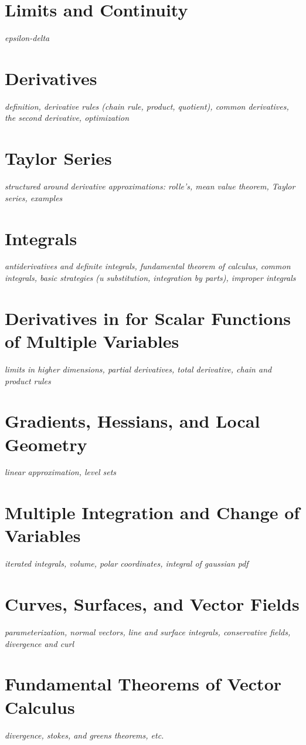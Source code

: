 \documentclass[../../../main.tex]{subfiles}
\begin{document}

\section{Limits and Continuity}
\textit{epsilon-delta}
\section{Derivatives}
\textit{definition, derivative rules (chain rule, product, quotient), common derivatives, the second derivative, optimization}
\section{Taylor Series}
\textit{structured around derivative approximations: rolle's, mean value theorem, Taylor series, examples}
\section{Integrals}
\textit{antiderivatives and definite integrals, fundamental theorem of calculus, common integrals, basic strategies (u substitution, integration by parts), improper integrals}
\section{Derivatives in for Scalar Functions of Multiple Variables}
\textit{limits in higher dimensions, partial derivatives, total derivative, chain and product rules}
\section{Gradients, Hessians, and Local Geometry}
\textit{linear approximation, level sets}
\section{Multiple Integration and Change of Variables}
\textit{iterated integrals, volume, polar coordinates, integral of gaussian pdf}
\section{Curves, Surfaces, and Vector Fields}
\textit{parameterization, normal vectors, line and surface integrals, conservative fields, divergence and curl}
\section{Fundamental Theorems of Vector Calculus}
\textit{divergence, stokes, and greens theorems, etc.}

\printbibliography[
    heading=subbibintoc,
    title={References}
]
\end{document}
